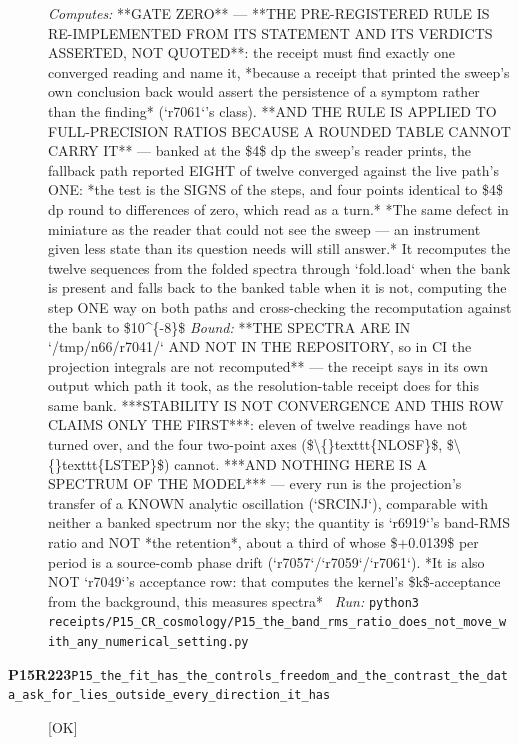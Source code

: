 \begin{description}
\emph{Computes:}  **GATE ZERO** --- **THE PRE-REGISTERED RULE IS RE-IMPLEMENTED FROM ITS STATEMENT AND ITS VERDICTS ASSERTED, NOT QUOTED**: the receipt must find exactly one converged reading and name it, *because a receipt that printed the sweep's own conclusion back would assert the persistence of a symptom rather than the finding* (`r7061`'s class).  **AND THE RULE IS APPLIED TO FULL-PRECISION RATIOS BECAUSE A ROUNDED TABLE CANNOT CARRY IT** --- banked at the \$4\$ dp the sweep's reader prints, the fallback path reported EIGHT of twelve converged against the live path's ONE: *the test is the SIGNS of the steps, and four points identical to \$4\$ dp round to differences of zero, which read as a turn.*  *The same defect in miniature as the reader that could not see the sweep --- an instrument given less state than its question needs will still answer.* It recomputes the twelve sequences from the folded spectra through `fold.load` when the bank is present and falls back to the banked table when it is not, computing the step ONE way on both paths and cross-checking the recomputation against the bank to \$10\textasciicircum{}\{-8\}\$
 \emph{Bound:}  **THE SPECTRA ARE IN `/tmp/n66/r7041/` AND NOT IN THE REPOSITORY, so in CI the projection integrals are not recomputed** --- the receipt says in its own output which path it took, as the resolution-table receipt does for this same bank.  ***STABILITY IS NOT CONVERGENCE AND THIS ROW CLAIMS ONLY THE FIRST***: eleven of twelve readings have not turned over, and the four two-point axes (\$\textbackslash\{\}texttt\{NLOSF\}\$, \$\textbackslash\{\}texttt\{LSTEP\}\$) cannot.  ***AND NOTHING HERE IS A SPECTRUM OF THE MODEL*** --- every run is the projection's transfer of a KNOWN analytic oscillation (`SRCINJ`), comparable with neither a banked spectrum nor the sky; the quantity is `r6919`'s band-RMS ratio and NOT *the retention*, about a third of whose \$+0.0139\$ per period is a source-comb phase drift (`r7057`/`r7059`/`r7061`). *It is also NOT `r7049`'s acceptance row: that computes the kernel's \$k\$-acceptance from the background, this measures spectra*
\ \emph{Run:} \texttt{python3 receipts/P15\_CR\_cosmology/P15\_the\_band\_rms\_ratio\_does\_not\_move\_with\_any\_numerical\_setting.py}
\item[\rcptlabel{P15_the_fit_has_the_controls_freedom_and_the_contrast_the_data_ask_for_lies_outside_every_direction_it_has}{P15R223}\textbf{P15R223}\quad\texttt{P15\_the\_fit\_has\_the\_controls\_freedom\_and\_the\_contrast\_the\_data\_ask\_for\_lies\_outside\_every\_direction\_it\_has}]\hfill\textsf{[OK]}\\

\end{description}
